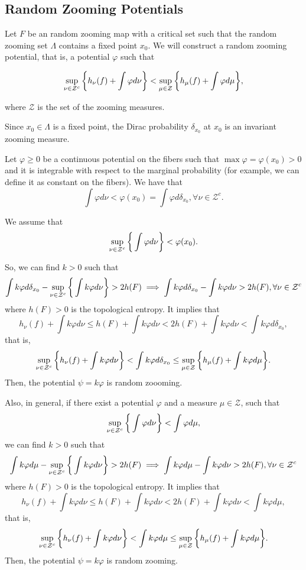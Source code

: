 \documentclass[12pt,a4paper]{amsart}
\theoremstyle{plain}
\begin{document}
	\subsection{Random Zooming Potentials}\label{fixed} Let $F$ be an random zooming map with a critical set such that the random zooming set $\Lambda$ contains a fixed point $x_{0}$. We will construct a random zooming potential, that is, a potential $\varphi$ such that
	
	\begin{equation*}
		\label{equaexpandpoten}
		\sup_{\nu \in \mathcal{Z}^{c}}\bigg{\{} h_{\nu}(f) + \int \varphi d\nu \bigg{\}} < \sup_{\mu \in \mathcal{Z}}\bigg{\{} h_{\mu}(f) + \int \varphi d\mu \bigg{\}},
	\end{equation*}
	
	where $\mathcal{Z}$ is the set of the zooming measures.
	
	Since $x_{0} \in \Lambda$ is a fixed point, the Dirac probability $\delta_{x_{0}}$ at $x_{0}$  is an invariant zooming measure.
	
	Let $\varphi \geq 0$ be a continuous potential on the fibers such that $\max \varphi = \varphi(x_{0}) > 0$ and it is integrable with respect to the marginal probability (for example, we can define it as constant on the fibers). We have that
	\[
	\int \varphi d\nu < \varphi(x_{0}) = \int \varphi d\delta_{x_{0}}, \forall \nu \in \mathcal{Z}^{c}.
	\]
	
	We assume that
	\[
	\sup_{\nu \in \mathcal{Z}^{c}}\bigg{\{} \int \varphi d\nu \bigg{\}} < \varphi(x_{0}).
	\]
	
	So, we can find $k > 0$ such that
	\[
	\int k\varphi d\delta_{x_{0}} - \sup_{\nu \in \mathcal{Z}^{c}}\bigg{\{} \int k\varphi d\nu \bigg{\}} > 2h(F) \implies \int k\varphi d\delta_{x_{0}} -  \int k\varphi d\nu > 2h(F), \forall \nu \in \mathcal{Z}^{c}  
	\]
	where $h(F) > 0$ is the topological entropy. It implies that
	\[
	h_{\nu}(f) + \int k\varphi d\nu \leq h(F) + \int k\varphi d\nu < 2h(F) + \int k\varphi d\nu < \int k\varphi d\delta_{x_{0}},
	\]
	that is,
	\[
	\sup_{\nu \in \mathcal{Z}^{c}}\bigg{\{} h_{\nu}(f) + \int k\varphi d\nu \bigg{\}} < \int k\varphi d\delta_{x_{0}} \leq \sup_{\mu \in \mathcal{Z}}\bigg{\{} h_{\mu}(f) + \int k\varphi d\mu \bigg{\}}.
	\]
	Then, the potential $\psi = k\varphi$ is random zoooming.
	
	
	Also, in general, if there exist a potential $\varphi$ and a measure $\mu \in \mathcal{Z}$, such that
	\[
	\sup_{\nu \in \mathcal{Z}^{c}}\bigg{\{} \int \varphi d\nu \bigg{\}} < \int \varphi d\mu,
	\]
	we can find $k > 0$ such that
	\[
	\int k\varphi d\mu - \sup_{\nu \in \mathcal{Z}^{c}}\bigg{\{} \int k\varphi d\nu \bigg{\}} > 2h(F) \implies \int k\varphi d\mu -  \int k\varphi d\nu > 2h(F), \forall \nu \in \mathcal{Z}^{c}  
	\]
	where $h(F) > 0$ is the topological entropy. It implies that
	\[
	h_{\nu}(f) + \int k\varphi d\nu \leq h(F) + \int k\varphi d\nu < 2h(F) + \int k\varphi d\nu < \int k\varphi d\mu,
	\]
	that is,
	\[
	\sup_{\nu \in \mathcal{Z}^{c}}\bigg{\{} h_{\nu}(f) + \int k\varphi d\nu \bigg{\}} < \int k\varphi d\mu \leq \sup_{\mu \in \mathcal{Z}}\bigg{\{} h_{\mu}(f) + \int k\varphi d\mu \bigg{\}}.
	\]
	Then, the potential $\psi = k\varphi$ is random zooming.
	
\end{document}
